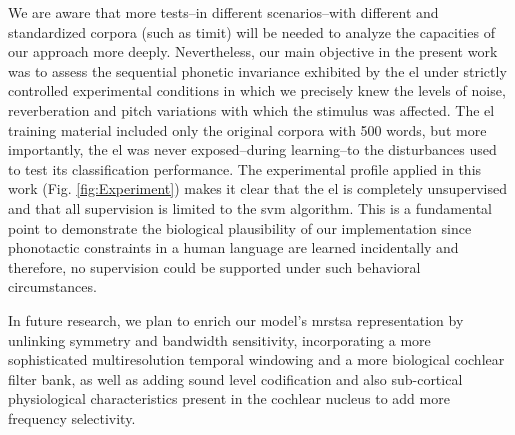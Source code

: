 \documentclass[10pt,letterpaper]{article}
\begin{document}
We are aware that more tests--in different scenarios--with different and standardized corpora (such as \gls{timit}) will be needed to analyze the capacities of our approach more deeply.
Nevertheless, our main objective in the present work was to assess the sequential phonetic invariance exhibited by the \gls{el} under strictly controlled experimental conditions in which we precisely knew the levels of noise, reverberation and pitch variations with which the stimulus was affected. The \gls{el} training material included only the original corpora with 500 words, but more importantly, the \gls{el} was never exposed--during learning--to the disturbances used to test its classification performance. The experimental profile applied in this work (Fig. \ref{fig:Experiment}) makes it clear that the \gls{el} is completely unsupervised and that all supervision is limited to the \gls{svm} algorithm. This is a fundamental point to demonstrate the biological plausibility of our implementation since phonotactic constraints in a human language are learned incidentally \cite{BRENT199693,saffran_1997} and therefore, no supervision could be supported under such behavioral circumstances.



In future research, we plan to enrich our model's \gls{mrstsa} representation by unlinking symmetry and bandwidth sensitivity, incorporating a more sophisticated multiresolution temporal windowing and a more biological cochlear filter bank, as well as adding sound level codification and also sub-cortical physiological characteristics present in the cochlear nucleus to add more frequency selectivity.
\end{document}
